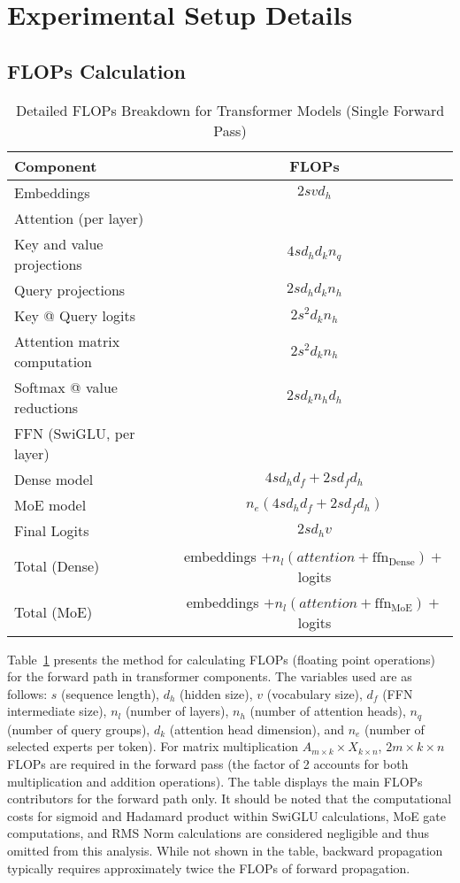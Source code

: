 \clearpage
\section{Experimental Setup Details}
\subsection{FLOPs Calculation}

\begin{table}[t]
\caption{Detailed FLOPs Breakdown for Transformer Models (Single Forward Pass)}
\label{tab:detailed-flops}
\centering
\small
\begin{tabular}{lc}
\toprule
Component & FLOPs \\
\midrule
Embeddings & $2svd_h$ \\
\midrule
Attention (per layer) &  \\
\quad Key and value projections & $4sd_h d_k n_q$ \\
\quad Query projections & $2sd_h d_k n_h$ \\
\quad Key @ Query logits & $2s^2d_k n_h$ \\
\quad Attention matrix computation & $2s^2d_k n_h$ \\
\quad Softmax @ value reductions & $2sd_k n_h d_h $ \\
\midrule
FFN (SwiGLU, per layer) & \\
\quad Dense model & $4sd_h d_f + 2sd_fd_h$ \\
\quad MoE model & $n_e(4sd_h d_f + 2sd_fd_h)$ \\
\midrule
Final Logits & $2sd_hv$ \\
\midrule
Total (Dense) & embeddings $+ n_l(attention + \text{ffn}_{\text{Dense}}) + $ logits \\
Total (MoE) & embeddings $+ n_l(attention + \text{ffn}_{\text{MoE}}) + $ logits \\
\bottomrule
\end{tabular}
\end{table}

Table~\ref{tab:detailed-flops} presents the method for calculating FLOPs (floating point operations) for the forward path in transformer components. The variables used are as follows: $s$ (sequence length), $d_h$ (hidden size), $v$ (vocabulary size), $d_f$ (FFN intermediate size), $n_l$ (number of layers), $n_h$ (number of attention heads), $n_q$ (number of query groups), $d_k$ (attention head dimension), and $n_e$ (number of selected experts per token). For matrix multiplication $A_{m\times k} \times X_{k\times n}$, $2m\times k \times n$ FLOPs are required in the forward pass (the factor of 2 accounts for both multiplication and addition operations). The table displays the main FLOPs contributors for the forward path only. It should be noted that the computational costs for sigmoid and Hadamard product within SwiGLU calculations, MoE gate computations, and RMS Norm calculations are considered negligible and thus omitted from this analysis. While not shown in the table, backward propagation typically requires approximately twice the FLOPs of forward propagation.

